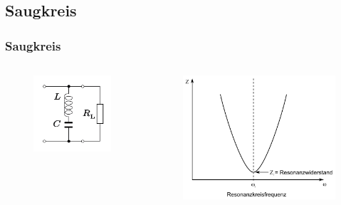 \subsection*{Saugkreis}
\begin{frame}
  \frametitle{Saugkreis}
  \begin{center}
    \begin{columns}
      \begin{figure}
        \includegraphics[width=\textwidth,height=.45\textheight,keepaspectratio]{e07/Saugkreis.png}
      \end{figure}
      \begin{figure}
        \includegraphics[width=\textwidth,height=.45\textheight,keepaspectratio]{e07/SerirenschwSig.png}

\end{figure}
\end{columns}
\end{center}
\end{frame}

